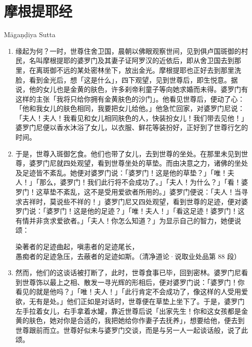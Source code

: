 \section{摩根提耶经}

\begin{center}Māgaṇḍiya Sutta\end{center}\vspace{1em}

\begin{enumerate}\item 缘起为何？一时，世尊住舍卫国，晨朝以佛眼观察世间，见到俱卢国斑御的村民，名叫摩根提耶的婆罗门及其妻子证阿罗汉的近依后，即从舍卫国去到那里，在离斑御不远的某处密林坐下，放出金光。摩根提耶也正好去到那里洗脸，看到金光后，想「这是什么」，四下观望，见到世尊后，即生悦意。据说，他的女儿也是金黄的肤色，许多刹帝利童子等向她求婚而未得。婆罗门有这样的主张「我将只给你拥有金黄肤色的沙门」。他看见世尊后，便动了心：「他和我女儿的肤色相同，我要把女儿给他。」他急忙回家，对婆罗门尼说：「夫人！夫人！我看见和女儿相同肤色的人，快装扮女儿！我们带去见他！」婆罗门尼便以香水沐浴了女儿，以衣服、鲜花等装扮好，正好到了世尊行乞的时间。
\item 于是，世尊入斑御乞食。他们也带了女儿，去到世尊的坐处。在那里未见到世尊，婆罗门尼就四处观望，看到世尊坐处的草垫。而由决意之力，诸佛的坐处及足迹皆不紊乱。她便对婆罗门说：「婆罗门！这是他的草垫？」「唯！夫人！」「那么，婆罗门！我们此行将不会成功了。」「夫人！为什么？」「看！婆罗门！这草垫不紊乱，这不是受用爱欲者所用的。」婆罗门便说：「夫人！当寻求吉祥时，莫说些不祥的！」婆罗门尼又四处观望，看到世尊的足迹，便对婆罗门说：「婆罗门！这是他的足迹？」「唯！夫人！」「看这足迹！婆罗门！这有情并非贪求爱欲者。」「夫人！你怎么知道？」为显示自己的智力，她便说颂：\begin{quoting}染著者的足迹曲起，嗔恚者的足迹尾长，\\愚痴者的足迹急压，去蔽者的足迹如斯。（清净道论·说取业处品第 88 段）\end{quoting}
\item 然而，他们的这谈话被打断了，此时，世尊食事已毕，回到密林。婆罗门尼看到世尊饰以最上之相、散发一寻光辉的形相后，便对婆罗门说：「婆罗门！你看见的就是他吗？」「唯！夫人！」「此行肯定不会成功了，像这样的人受用爱欲，无有是处。」他们正如是对话时，世尊便在草垫上坐下了。于是，婆罗门左手拉着女儿，右手拿着水罐，靠近世尊后说「出家先生！你和这女孩都是金黄的肤色，她对你是合适的，我把她给你作妻子去抚养」，想要给他，便去到世尊跟前而立。世尊好似未与婆罗门交谈，而是与另一人一起谈话般，说了此颂。\end{enumerate}

